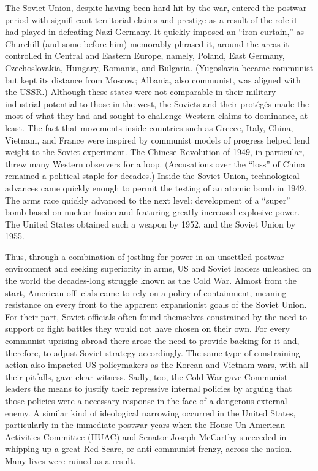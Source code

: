 \documentclass[
  openany]{book}
\begin{document}
The Soviet Union, despite having been hard hit by the war, entered the postwar period with signifi cant territorial claims and prestige as a result of the role it had played in defeating Nazi Germany. It quickly imposed an ``iron curtain,'' as Churchill (and some before him) memorably phrased it, around the areas it controlled in Central and Eastern Europe, namely, Poland, East Germany, Czechoslovakia, Hungary, Romania, and Bulgaria. (Yugoslavia became communist but kept its distance from Moscow; Albania, also communist, was aligned with the USSR.) Although these states were not comparable in their military-industrial potential to those in the west, the Soviets and their protégés made the most of what they had and sought to challenge Western claims to dominance, at least. The fact that movements inside countries such as Greece, Italy, China, Vietnam, and France were inspired by communist models of progress helped lend weight to the Soviet experiment. The Chinese Revolution of 1949, in particular, threw many Western observers for a loop. (Accusations over the ``loss'' of China remained a political staple for decades.) Inside the Soviet Union, technological advances came quickly enough to permit the testing of an atomic bomb in 1949. The arms race quickly advanced to the next level: development of a ``super'' bomb based on nuclear fusion and featuring greatly increased explosive power. The United States obtained such a weapon by 1952, and the Soviet Union by 1955.

Thus, through a combination of jostling for power in an unsettled postwar environment and seeking superiority in arms, US and Soviet leaders unleashed on the world the decades-long struggle known as the Cold War. Almost from the start, American offi cials came to rely on a policy of containment, meaning resistance on every front to the apparent expansionist goals of the Soviet Union. For their part, Soviet officials often found themselves constrained by the need to support or fight battles they would not have chosen on their own. For every communist uprising abroad there arose the need to provide backing for it and, therefore, to adjust Soviet strategy accordingly. The same type of constraining action also impacted US policymakers as the Korean and Vietnam wars, with all their pitfalls, gave clear witness. Sadly, too, the Cold War gave Communist leaders the means to justify their repressive internal policies by arguing that those policies were a necessary response in the face of a dangerous external enemy. A similar kind of ideological narrowing occurred in the United States, particularly in the immediate postwar years when the House Un-American Activities Committee (HUAC) and Senator Joseph McCarthy succeeded in whipping up a great Red Scare, or anti-communist frenzy, across the nation. Many lives were ruined as a result.
\end{document}
